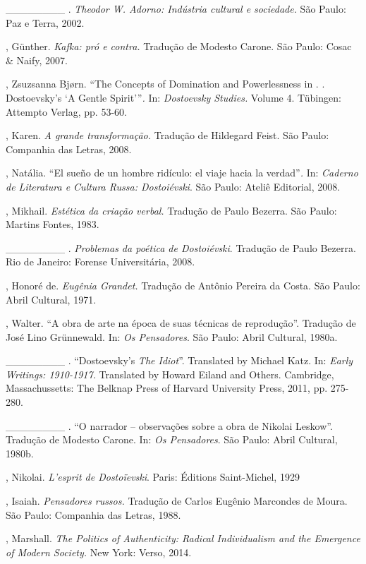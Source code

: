 \begin{Parskip}
\_\_\_\_\_\_\_\_ . \emph{Theodor W. Adorno: Indústria cultural e
sociedade.} São Paulo: Paz e Terra, 2002.

, Günther. \emph{Kafka: pró e contra.} Tradução de Modesto Carone.
São Paulo: Cosac \& Naify, 2007.

, Zsuzsanna Bjørn. ``The Concepts of Domination and
Powerlessness in . . Dostoevsky's `A Gentle Spirit'''\emph{.} In:
\emph{Dostoevsky Studies.} Volume 4. Tübingen: Attempto Verlag, pp.
53-60.

, Karen. \emph{A grande transformação.} Tradução de Hildegard
Feist. São Paulo: Companhia das Letras, 2008.

, Natália. ``El sueño de un hombre ridículo: el viaje hacia la
verdad''\emph{.} In: \emph{Caderno de Literatura e Cultura Russa:
Dostoiévski}. São Paulo: Ateliê Editorial, 2008.

, Mikhail. \emph{Estética da criação verbal.} Tradução de Paulo
Bezerra. São Paulo: Martins Fontes, 1983.

\_\_\_\_\_\_\_\_ . \emph{Problemas da poética de Dostoiévski}. Tradução
de Paulo Bezerra. Rio de Janeiro: Forense Universitária, 2008.

, Honoré de. \emph{Eugênia Grandet.} Tradução de Antônio Pereira
da Costa. São Paulo: Abril Cultural, 1971.

, Walter. ``A obra de arte na época de suas técnicas de
reprodução''. Tradução de José Lino Grünnewald. In: \emph{Os
Pensadores}. São Paulo: Abril Cultural, 1980a.

\_\_\_\_\_\_\_\_ . ``Dostoevsky's \emph{The Idiot}''. Translated by
Michael Katz. In: \emph{Early Writings: 1910-1917.} Translated by Howard
Eiland and Others. Cambridge, Massachussetts: The Belknap Press of
Harvard University Press, 2011, pp. 275-280.

\_\_\_\_\_\_\_\_ . ``O narrador -- observações sobre a obra de Nikolai
Leskow''. Tradução de Modesto Carone. In: \emph{Os Pensadores}. São
Paulo: Abril Cultural, 1980b.

, Nikolai. \emph{L'esprit de Dostoïevski}. Paris: Éditions
Saint-Michel, 1929

, Isaiah. \emph{Pensadores russos.} Tradução de Carlos Eugênio
Marcondes de Moura. São Paulo: Companhia das Letras, 1988.

, Marshall. \emph{The Politics of Authenticity: Radical
Individualism and the Emergence of Modern Society.} New York: Verso,
2014.


\end{Parskip}
